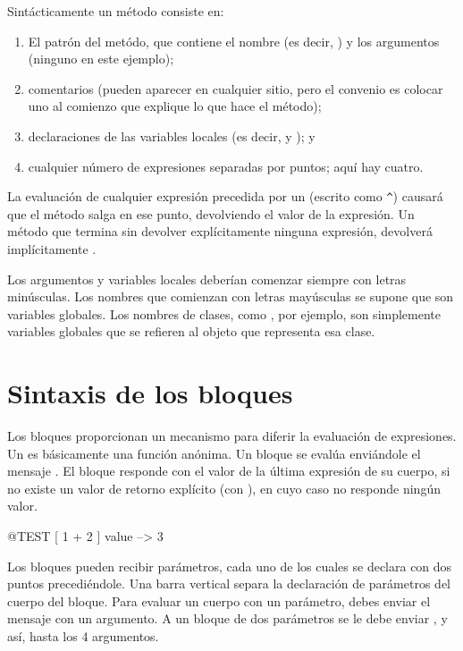 \documentclass[a4paper,10pt,twoside]{book}
\begin{document}
Sintácticamente un método consiste en:
\begin{enumerate}
  \item El patrón del metódo, que contiene el nombre (es decir, ) y los argumentos (ninguno en este ejemplo);
  \item comentarios (pueden aparecer en cualquier sitio, pero el convenio es colocar uno al comienzo que explique lo que hace el método);
  \item declaraciones de las variables locales (es decir,  y ); y
  \item cualquier número de expresiones separadas por puntos; aquí hay cuatro.
\end{enumerate}

La evaluación de cualquier expresión precedida por un \ct{^} (escrito como \verb|^|) causará que el método salga en ese punto, devolviendo el valor de la expresión.
Un método que termina sin devolver explícitamente ninguna expresión, devolverá implícitamente .

Los argumentos y variables locales deberían comenzar siempre con letras minúsculas.
Los nombres que comienzan con letras mayúsculas se supone que son variables globales.
Los nombres de clases, como , por ejemplo, son simplemente variables globales que se refieren al objeto que representa esa clase.


\section{Sintaxis de los bloques}

Los bloques proporcionan un mecanismo para diferir la evaluación de expresiones.
Un  es básicamente una función anónima. Un bloque se evalúa enviándole el mensaje .
El bloque responde con el valor de la última expresión de su cuerpo, si no existe un valor de retorno explícito (con \ct{^}), en cuyo caso no responde ningún valor.

\begin{code}{@TEST}
[ 1 + 2 ] value --> 3
\end{code}

Los bloques pueden recibir parámetros, cada uno de los cuales se declara con dos puntos precediéndole. Una barra vertical separa la declaración de parámetros del cuerpo del bloque. Para evaluar un cuerpo con un parámetro, debes enviar el mensaje  con un argumento. A un bloque de dos parámetros se le debe enviar , y así, hasta los 4 argumentos.
\end{document}
